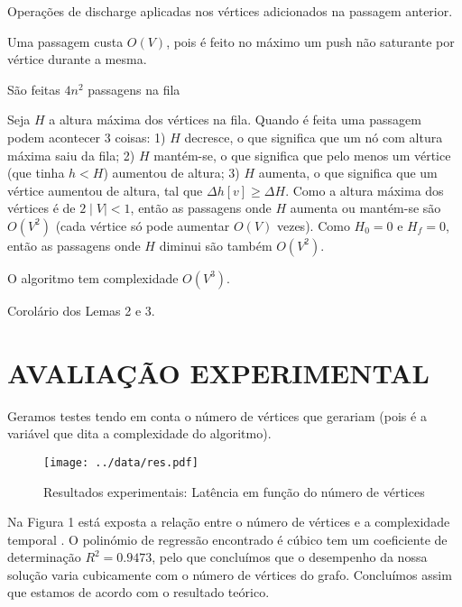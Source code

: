 \documentclass[a4paper, 12pt, conference, portuguese]{ieeeconf}
\begin{document}
\begin{defin} [Passagem]
  Operações de discharge aplicadas nos vértices adicionados na
  passagem anterior.
\end{defin}

\begin{lemma}
  Uma passagem custa $O(V)$, pois é feito no máximo um push não
  saturante por vértice durante a mesma.
\end{lemma}

\begin{lemma} São feitas $4n^2$ passagens na fila \end{lemma}

\begin{dem}
  Seja $H$ a altura máxima dos vértices na fila. Quando é feita
  uma passagem podem acontecer $3$ coisas: 1) $H$
  decresce, o que significa que um nó com altura máxima saiu da
  fila; 2) $H$ mantém-se, o que significa que pelo menos um
  vértice (que tinha $h < H$) aumentou de altura; 3) $H$ aumenta,
  o que significa que um vértice aumentou de altura, tal que
  $\Delta h[v] \geq \Delta H$. Como a altura máxima dos vértices
  é de $2 \mid V \mid < 1$, então as passagens onde $H$ aumenta
  ou mantém-se são $O(V^2)$ (cada vértice só pode aumentar $O(V)$
  vezes). Como $H_0 = 0$ e $H_f = 0$, então as passagens onde $H$
  diminui são também $O(V^2)$.
\end{dem}

\begin{theorem}
  O algoritmo tem complexidade $O(V^3)$.
\end{theorem}
\begin{dem}
  Corolário dos Lemas 2 e 3.
\end{dem}
\section{AVALIAÇÃO EXPERIMENTAL}\label{experimental}

Geramos testes tendo em conta o número de vértices que gerariam
(pois é a variável que dita a complexidade do algoritmo).
\begin{figure}[t]
  \centering
  \texttt{[image: ../data/res.pdf]}
  \caption{Resultados experimentais: Latência em função do número
    de vértices}
\end{figure}

Na Figura 1 está exposta a relação entre o número de
vértices e a complexidade temporal . O polinómio de regressão
encontrado é cúbico tem um coeficiente de determinação $R^2 =
0.9473$, pelo que concluímos que o desempenho da nossa solução
varia cubicamente com o
número de vértices do grafo. Concluímos assim que estamos de
acordo com o resultado teórico.
\end{document}
